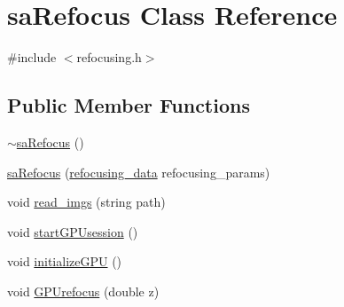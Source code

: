 \hypertarget{classsaRefocus}{\section{sa\-Refocus Class Reference}
\label{d7/d89/classsaRefocus}
}


{\ttfamily \#include $<$refocusing.\-h$>$}

\subsection*{Public Member Functions}
\begin{DoxyCompactItemize}
\item 
\hyperlink{classsaRefocus_a26ed5105f23d8a55aad8fa9a0d40730d}{$\sim$sa\-Refocus} ()
\item 
\hyperlink{classsaRefocus_a0ffb104adab5ec118e861ee1ed5a1c52}{sa\-Refocus} (\hyperlink{structrefocusing__data}{refocusing\-\_\-data} refocusing\-\_\-params)
\item 
void \hyperlink{classsaRefocus_a3d75da5d4cf776ea324413f9f138ef70}{read\-\_\-imgs} (string path)
\item 
void \hyperlink{classsaRefocus_a9e8c8607a12c3bafa2034091301a9bcd}{start\-G\-P\-Usession} ()
\item 
void \hyperlink{classsaRefocus_a2a17871cc22d0b1aed028ad6052f20b4}{initialize\-G\-P\-U} ()
\item 
void \hyperlink{classsaRefocus_accfd127ad822c0458d30e840b44663ba}{G\-P\-Urefocus} (double z)
\end{DoxyCompactItemize}


